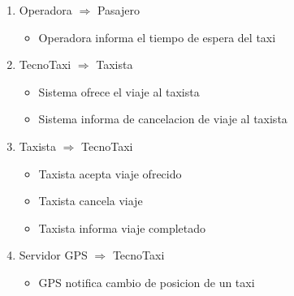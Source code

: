 \begin{enumerate}
\item Operadora $\Rightarrow$ Pasajero

\begin{itemize}
\item Operadora informa el tiempo de espera del taxi
\end{itemize}

\item TecnoTaxi $\Rightarrow$ Taxista

\begin{itemize}
\item Sistema ofrece el viaje al taxista
\item Sistema informa de cancelacion de viaje al taxista
\end{itemize}

\item Taxista $\Rightarrow$ TecnoTaxi

\begin{itemize}
 \item Taxista acepta viaje ofrecido
 \item Taxista cancela viaje
 \item Taxista informa viaje completado
 \end{itemize}

\item Servidor GPS $\Rightarrow$ TecnoTaxi

\begin{itemize}
\item GPS notifica cambio de posicion de un taxi
\end{itemize}	

\end{enumerate}


